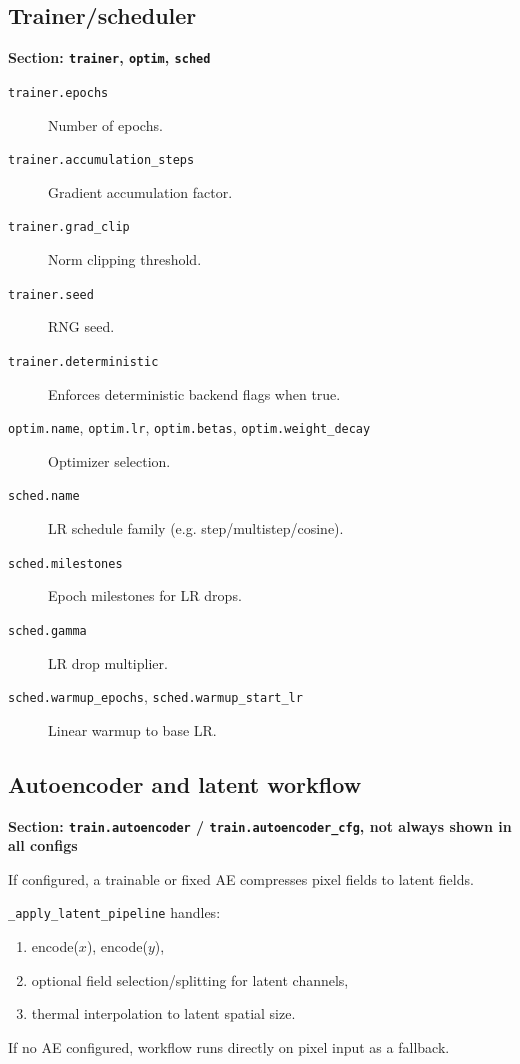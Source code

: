 \documentclass[11pt]{article}
\begin{document}
\subsection{Trainer/scheduler}
\textbf{Section: \texttt{trainer}, \texttt{optim}, \texttt{sched}}
\begin{description}
  \item[\texttt{trainer.epochs}] Number of epochs.
  \item[\texttt{trainer.accumulation\_steps}] Gradient accumulation factor.
  \item[\texttt{trainer.grad\_clip}] Norm clipping threshold.
  \item[\texttt{trainer.seed}] RNG seed.
  \item[\texttt{trainer.deterministic}] Enforces deterministic backend flags when true.
  \item[\texttt{optim.name}, \texttt{optim.lr}, \texttt{optim.betas}, \texttt{optim.weight\_decay}] Optimizer selection.
  \item[\texttt{sched.name}] LR schedule family (e.g. step/multistep/cosine).
  \item[\texttt{sched.milestones}] Epoch milestones for LR drops.
  \item[\texttt{sched.gamma}] LR drop multiplier.
  \item[\texttt{sched.warmup\_epochs}, \texttt{sched.warmup\_start\_lr}] Linear warmup to base LR.
\end{description}

\subsection{Autoencoder and latent workflow}
\textbf{Section: \texttt{train.autoencoder} / \texttt{train.autoencoder\_cfg}, not always shown in all configs}
\begin{description}
  \item If configured, a trainable or fixed AE compresses pixel fields to latent fields.
  \item \texttt{_apply\_latent\_pipeline} handles:
  \begin{enumerate}
    \item encode($x$), encode($y$),
    \item optional field selection/splitting for latent channels,
    \item thermal interpolation to latent spatial size.
  \end{enumerate}
  \item If no AE configured, workflow runs directly on pixel input as a fallback.
\end{description}
\end{document}

